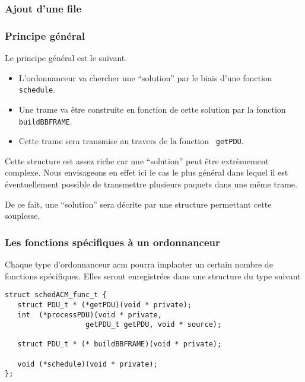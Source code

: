 \documentclass{article}
\begin{document}
\subsubsection{Ajout d'une file}

%
\subsubsection{Principe général}

   Le principe général est le suivant.

\begin{itemize}
   \item L'ordonnanceur va chercher une ``solution'' par le biais d'une
   fonction {\tt schedule}.
   \item Une trame va être construite en fonction de cette solution
     par la fonction {\tt buildBBFRAME}.
   \item Cette trame sera transmise au travers de la fonction {\tt
     getPDU}.
\end{itemize}

   Cette structure est assez riche car une ``solution'' peut être
extrèmement complexe. Nous envisageons en effet ici le cas le plus
général dans lequel il est éventuellement possible de transmettre
plusieurs paquets dans une même trame.

   De ce fait, une ``solution'' sera décrite par une structure
permettant cette souplesse.

%
\subsubsection{Les fonctions spécifiques à un ordonnanceur}

   Chaque type d'ordonnanceur {\sc acm} pourra implanter un certain
nombre de fonctions spécifiques. Elles seront enregistrées dans une
structure du type suivant 

\begin{verbatim}
struct schedACM_func_t {
   struct PDU_t * (*getPDU)(void * private);
   int  (*processPDU)(void * private,
	               getPDU_t getPDU, void * source);

   struct PDU_t * (* buildBBFRAME)(void * private);

   void (*schedule)(void * private);
};
\end{verbatim}
\end{document}
